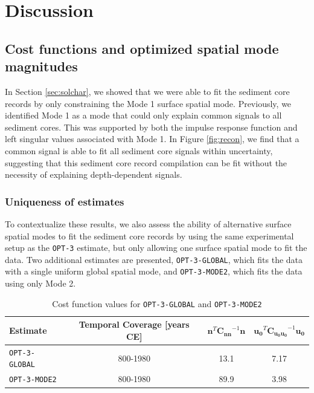 \documentclass[draft]{agujournal2019}
\begin{document}
\section{Discussion}
\subsection{Cost functions and optimized spatial mode magnitudes}
In Section \ref{sec:solchar}, we showed that we were able to fit the sediment core records by only constraining the Mode 1 surface spatial mode. Previously, we identified Mode 1 as a mode that could only explain common signals to all sediment cores. This was supported by both the impulse response function and left singular values associated with Mode 1. In Figure \ref{fig:recon}, we find that a common signal is able to fit all sediment core signals within uncertainty, suggesting that this sediment core record compilation can be fit without the necessity of explaining depth-dependent signals. 
\subsubsection{Uniqueness of estimates \label{sec:singlemode}}
To contextualize these results, we also assess the ability of alternative surface spatial modes to fit the sediment core records by using the same experimental setup as the \texttt{OPT-3} estimate, but only allowing one surface spatial mode to fit the data. Two additional estimates are presented, \texttt{OPT-3-GLOBAL}, which fits the data with a single uniform global spatial mode, and \texttt{OPT-3-MODE2}, which fits the data using only Mode 2.
\begin{table}
\caption{Cost function values for \texttt{OPT-3-GLOBAL} and \texttt{OPT-3-MODE2} \label{tab:costalt}}
\centering
\begin{tabular}{l | c | c | c }
\hline
 Estimate & Temporal Coverage [years CE] & $\mathbf{n}^T\mathbf{C_{nn}}^{-1}\mathbf{n}$ & $\mathbf{u_0}^T\mathbf{C_{u_0u_0}}^{-1}\mathbf{u_0}$ \\ %
\hline
  \texttt{OPT-3-GLOBAL} & 800-1980 & 13.1 & 7.17 \\%
  \texttt{OPT-3-MODE2}  & 800-1980 &  89.9 & 3.98 \\%
\hline
\end{tabular}
\end{table}
\end{document}
